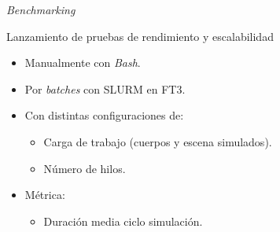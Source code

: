 \documentclass[10pt,xcolor=table]{beamer}
\begin{document}
\begin{frame}{\emph{Benchmarking}}
    \begin{block}{Lanzamiento de pruebas de rendimiento y escalabilidad}
      \begin{itemize}
      \item Manualmente con \textit{Bash}.
      \item Por \textit{batches} con SLURM en FT3.
      \item Con distintas configuraciones de:
        \begin{itemize}
        \item Carga de trabajo (cuerpos y escena simulados).
        \item Número de hilos.
        \end{itemize}
      \item Métrica:
        \begin{itemize}
        \item Duración media ciclo simulación.
        \end{itemize}
      \end{itemize}
    \end{block}
\end{frame}
\end{document}
